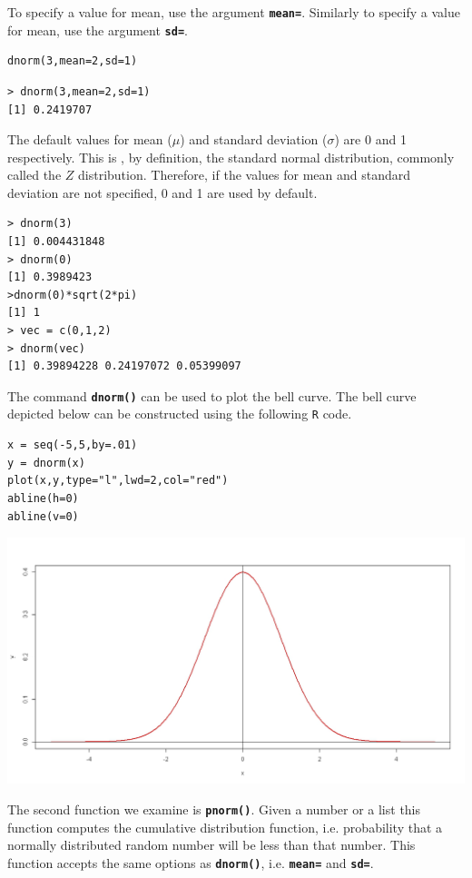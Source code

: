 \documentclass[a4paper,12pt]{article}
\begin{document}
To specify a value for mean, use the argument \textbf{\texttt{mean=}}. Similarly to specify a value for mean, use the argument \textbf{\texttt{sd=}}.

\begin{framed}
\begin{verbatim}
dnorm(3,mean=2,sd=1)
\end{verbatim}
\end{framed}
\begin{verbatim}
> dnorm(3,mean=2,sd=1)
[1] 0.2419707
\end{verbatim}
The default values for mean ($\mu$) and standard deviation ($\sigma$) are 0 and 1 respectively. This is , by definition, the standard normal distribution, commonly called the $Z$ distribution. Therefore, if the values for mean and standard deviation are not specified, 0 and 1 are used by default.
\begin{verbatim}
> dnorm(3)
[1] 0.004431848
> dnorm(0)
[1] 0.3989423
>dnorm(0)*sqrt(2*pi)
[1] 1
> vec = c(0,1,2)
> dnorm(vec)
[1] 0.39894228 0.24197072 0.05399097
\end{verbatim}
The command \texttt{\textbf{dnorm()}} can be used to plot the bell curve. The bell curve depicted below can be constructed using the following \texttt{R} code.
\begin{framed}
\begin{verbatim}
x = seq(-5,5,by=.01)
y = dnorm(x) 
plot(x,y,type="l",lwd=2,col="red")
abline(h=0)
abline(v=0)
\end{verbatim}
\end{framed}
 \begin{center}
 \includegraphics[scale=0.30]{dnormCurve}
 \end{center}
 

The second function we examine is \texttt{\textbf{pnorm()}}. Given a number or a list this function computes the cumulative distribution function, i.e. probability that a normally distributed random number will be less than that number. This function accepts the same options as \texttt{\textbf{dnorm()}}, i.e. \texttt{\textbf{mean=}} and \texttt{\textbf{sd=}}.
\end{document}
